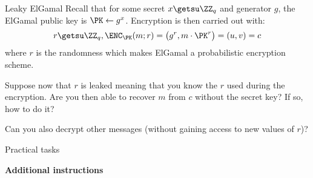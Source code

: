 \documentclass{homework}
\begin{document}
\begin{task}{Leaky ElGamal}
  Recall that for some secret $x\getsu\ZZ_q$ and generator $g$, the ElGamal public key is $\PK\gets g^x$.
  Encryption is then carried out with:
  \[
    r \getsu \ZZ_q, \ENC_\PK(m; r) = \bigl(g^r, m \cdot \PK^r\bigr) = (u, v) = c
  \]
  where $r$ is the randomness which makes ElGamal a probabilistic encryption scheme.

  Suppose now that $r$ is leaked meaning that you know the $r$ used during the encryption.
  Are you then able to recover $m$ from $c$ without the secret key?
  If so, how to do it?

  Can you also decrypt other messages (without gaining access to new values of $r$)?
\end{task}

\newpage
\setcounter{task}{0}

\begin{center}
  Practical tasks
\end{center}

\textbf{Additional instructions}
\end{document}
